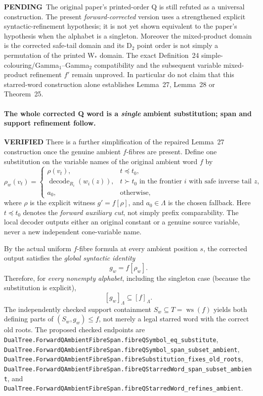 \documentclass[11pt]{article}
\newcommand{\ok}{\textcolor{green!40!black}{\textbf{VERIFIED}}}
\newcommand{\todo}{\textcolor{gray!70!black}{\textbf{PENDING}}}
\newcommand{\lean}[1]{\texttt{#1}}
\begin{document}
\todo\ The original paper's printed-order Q is still refuted
as a universal construction. The present \emph{forward-corrected}
version uses a strengthened explicit syntactic-refinement
hypothesis; it is not yet shown equivalent to the paper's
hypothesis when the alphabet is a singleton. Moreover the
mixed-product domain is the corrected safe-tail domain and
its D$_2$ point order is not simply a permutation of the
printed W$_*$ domain. The exact Definition~24
simple-colouring/Gamma$_1$--Gamma$_2$ compatibility
and the subsequent variable mixed-product refinement $f'$
remain unproved. In particular do not claim that this
starred-word construction alone establishes Lemma~27,
Lemma~28 or Theorem~25.


\paragraph{The whole corrected Q word is a \emph{single} ambient
substitution; span and support refinement follow.} \ok
There is a further simplification of the repaired
Lemma~27 construction once the genuine ambient $f$-fibres
are present. Define one substitution on the variable names
of the original ambient word $f$ by
\[
  \rho_w(v_t)=
  \begin{cases}
    \rho(v_t),&t\preccurlyeq t_0,\\
    \operatorname{decode}_{R_i}(w_i(z)),
       &t\succ t_0\text{ in the frontier }i
         \text{ with safe inverse tail }z,\\
    a_0,&\text{otherwise},
  \end{cases}
\]
where $\rho$ is the explicit witness $g'=f[\rho]$, and
$a_0\in\Lambda$ is the chosen fallback. Here
$t\preccurlyeq t_0$ denotes the \emph{forward auxiliary cut},
not simply prefix comparability. The local decoder outputs
either an original constant or a genuine source variable,
never a new independent cone-variable name.

By the actual uniform $f$-fibre formula at every ambient
position $s$, the corrected output satisfies the
\emph{global syntactic identity}
\[
             g_w=f[\rho_w].
\]
Therefore, for \emph{every nonempty alphabet}, including
the singleton case (because the substitution is explicit),
\[
       [g_w]_\Lambda\subseteq[f]_\Lambda.
\]
The independently checked support containment
$S_w\subseteq T=\operatorname{ws}(f)$ yields both defining
parts of $(S_w,g_w)\leq f$, not merely a legal
starred word with the correct old roots.
The proposed checked endpoints are
\lean{DualTree.ForwardQAmbientFibreSpan.fibreQSymbol_eq_substitute},
\lean{DualTree.ForwardQAmbientFibreSpan.fibreQSymbol_span_subset_ambient},
\lean{DualTree.ForwardQAmbientFibreSpan.fibreSubstitution_fixes_old_roots},
\lean{DualTree.ForwardQAmbientFibreSpan.fibreQStarredWord_span_subset_ambient},
and
\lean{DualTree.ForwardQAmbientFibreSpan.fibreQStarredWord_refines_ambient}.
\end{document}
